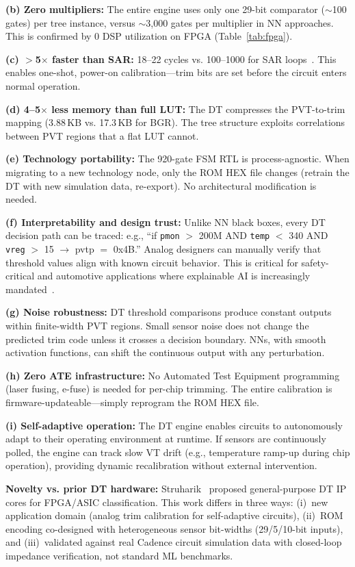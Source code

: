 \documentclass[lettersize,journal]{IEEEtran}
\begin{document}
\textbf{(b) Zero multipliers:} The entire engine uses only one 29-bit comparator ($\sim$100 gates) per tree instance, versus $\sim$3,000 gates per multiplier in NN approaches. This is confirmed by 0 DSP utilization on FPGA (Table~\ref{tab:fpga}).

\textbf{(c) $>$5$\times$ faster than SAR:} 18--22 cycles vs. 100--1000 for SAR loops~\cite{sar_gondi}. This enables one-shot, power-on calibration---trim bits are set before the circuit enters normal operation.

\textbf{(d) 4--5$\times$ less memory than full LUT:} The DT compresses the PVT-to-trim mapping (3.88\,KB vs. 17.3\,KB for BGR). The tree structure exploits correlations between PVT regions that a flat LUT cannot.

\textbf{(e) Technology portability:} The 920-gate FSM RTL is process-agnostic. When migrating to a new technology node, only the ROM HEX file changes (retrain the DT with new simulation data, re-export). No architectural modification is needed.

\textbf{(f) Interpretability and design trust:} Unlike NN black boxes, every DT decision path can be traced: e.g., ``if \texttt{pmon} $>$ 200M AND \texttt{temp} $<$ 340 AND \texttt{vreg} $>$ 15 $\to$ pvtp $=$ 0x4B.'' Analog designers can manually verify that threshold values align with known circuit behavior. This is critical for safety-critical and automotive applications where explainable AI is increasingly mandated~\cite{razavi_book}.

\textbf{(g) Noise robustness:} DT threshold comparisons produce constant outputs within finite-width PVT regions. Small sensor noise does not change the predicted trim code unless it crosses a decision boundary. NNs, with smooth activation functions, can shift the continuous output with any perturbation.

\textbf{(h) Zero ATE infrastructure:} No Automated Test Equipment programming (laser fusing, e-fuse) is needed for per-chip trimming. The entire calibration is firmware-updateable---simply reprogram the ROM HEX file.

\textbf{(i) Self-adaptive operation:} The DT engine enables circuits to autonomously adapt to their operating environment at runtime. If sensors are continuously polled, the engine can track slow VT drift (e.g., temperature ramp-up during chip operation), providing dynamic recalibration without external intervention.

\textbf{Novelty vs. prior DT hardware:} Struharik~\cite{dt_struharik} proposed general-purpose DT IP cores for FPGA/ASIC classification. This work differs in three ways: (i)~new application domain (analog trim calibration for self-adaptive circuits), (ii)~ROM encoding co-designed with heterogeneous sensor bit-widths (29/5/10-bit inputs), and (iii)~validated against real Cadence circuit simulation data with closed-loop impedance verification, not standard ML benchmarks.
\end{document}

